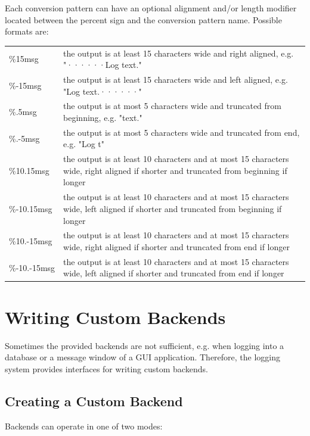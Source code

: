Each conversion pattern can have an optional alignment and/or length modifier located between the percent sign and the conversion pattern name. Possible formats are:

\begin{tabularx}{\textwidth}{ p{} X }
\%15msg 		& 	the output is at least 15 characters wide and right aligned, e.g. "······Log text." \\
\%-15msg  		& 	the output is at least 15 characters wide and left aligned, e.g. "Log text.······" \\
\%.5msg			& 	the output is at most 5 characters wide and truncated from beginning, e.g. "text." \\
\%.-5msg		& 	the output is at most 5 characters wide and truncated from end, e.g. "Log t" \\
\%10.15msg		& 	the output is at least 10 characters and at most 15 characters wide, right aligned if shorter and truncated from beginning if longer \\
\%-10.15msg		& 	the output is at least 10 characters and at most 15 characters wide, left aligned if shorter and truncated from beginning if longer \\
\%10.-15msg		& 	the output is at least 10 characters and at most 15 characters wide, right aligned if shorter and truncated from end if longer \\
\%-10.-15msg	& 	the output is at least 10 characters and at most 15 characters wide, left aligned if shorter and truncated from end if longer \\
\end{tabularx}

\newpage



\section{Writing Custom Backends} \label{sec:custombackends}
Sometimes the provided backends are not sufficient, e.g. when logging into a database or a message window of a GUI application. Therefore, the logging system provides interfaces for writing custom backends.

\subsection{Creating a Custom Backend}
Backends can operate in one of two modes:

